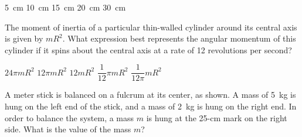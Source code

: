 \documentclass{../../../oss-ap12ibhl-print}
\begin{document}
\begin{questions}
  \begin{minipage}{.35\linewidth}
  \end{minipage}
  \begin{minipage}{.4\linewidth}  
    \begin{choices}
      \choice\SI{5}{\centi\metre}
      \choice\SI{10}{\centi\metre}
      \choice\SI{15}{\centi\metre}
      \choice\SI{20}{\centi\metre}
      \choice\SI{30}{\centi\metre}
    \end{choices}
  \end{minipage}

  \question The moment of inertia of a particular thin-walled cylinder around
  its central axis is given by $mR^2$. What expression best represents the
  angular momentum of this cylinder if it spins about the central axis at a
  rate of 12 revolutions per second?
  \begin{choices}
    \choice $24\pi mR^2$
    \choice $12\pi mR^2$
    \choice $12mR^2$
    \choice $\dfrac1{12}\pi mR^2$
    \choice $\dfrac1{12\pi}mR^2$
  \end{choices}
  \newpage
  
  \question A meter stick is balanced on a fulcrum at its center, as shown. A
  mass of \SI{5}{\kilo\gram} is hung on the left end of the stick, and a mass of
  \SI{2}{\kilo\gram} is hung on the right end. In order to balance the
  system, a mass $m$ is hung at the 25-cm mark on the right
  side. What is the value of the mass $m$?


\end{questions}
\end{document}

